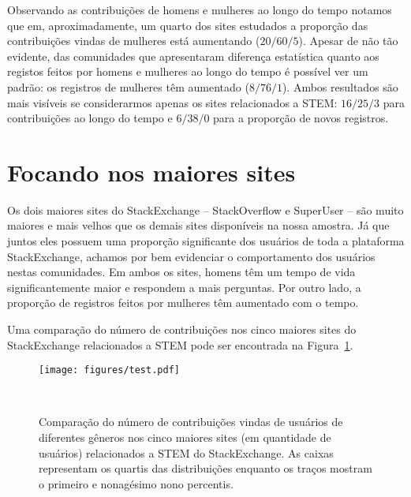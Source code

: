 Observando as contribuições de homens e mulheres ao longo do tempo notamos que em, aproximadamente, um quarto dos sites estudados a proporção das contribuições vindas de mulheres está aumentando ($20/60/5$). Apesar de não tão evidente, das comunidades que apresentaram diferença estatística quanto aos registos feitos por homens e mulheres ao longo do tempo é possível ver um padrão: os registros de mulheres têm aumentado ($8/76/1$). Ambos resultados são mais visíveis se considerarmos apenas os sites relacionados a STEM: $16/25/3$ para contribuições ao longo do tempo e $6/38/0$ para a proporção de novos registros.

\section{Focando nos maiores sites} %

Os dois maiores sites do StackExchange -- StackOverflow e SuperUser -- são muito maiores e mais velhos que os demais sites disponíveis na nossa amostra. Já que juntos eles possuem uma proporção significante dos usuários de toda a plataforma StackExchange, achamos por bem evidenciar o comportamento dos usuários nestas comunidades. Em ambos os sites, homens têm um tempo de vida significantemente maior e respondem a mais perguntas. Por outro lado, a proporção de registros feitos por mulheres têm aumentado com o tempo.

Uma comparação do número de contribuições nos cinco maiores sites do StackExchange relacionados a STEM pode ser encontrada na Figura~\ref{figure:top-five}.


\begin{figure}
  \centering
  \texttt{[image: figures/test.pdf]}
  \caption[Comparação do número de contribuições na 5 maiores comunidades.]{Comparação do número de contribuições vindas de usuários de diferentes gêneros nos cinco maiores sites (em quantidade de usuários) relacionados a STEM do StackExchange. As caixas representam os quartis das distribuições enquanto os traços mostram o primeiro e nonagésimo nono percentis.}~\label{figure:top-five}
\end{figure}




